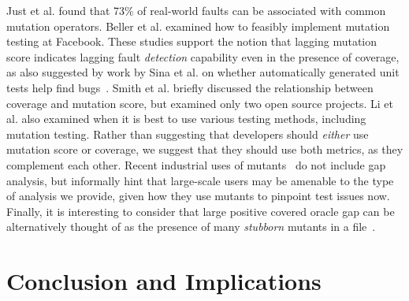 \documentclass[sigconf,review, anonymous]{acmart}
\begin{document}

\begin{comment}
Delgado-Pérez et al. \cite{DelgadoPerezCaseStudy} also performed mutation testing on 2,509 mutants over 15 functions. Their study 
primarily focused on analyzing equivalent mutants and the computational cost of finding these mutants.
They agree with the hypothesis that mutation testing is a better predictor of faults than a
traditional coverage based approach. This large scale study of mutation is similar to our Java study of a large number of
mutants, however the analysis and results differ in that they were analyzing equivalent mutants, while we are examining the
correlation between mutation score and coverage through the lens of the oracle gap. Additionally, our study is over a much 
larger sample size, with over 30 Java projects, that total have 463,417 lines of code, making it more appropriate for extrapolating
generalizable correlations.
\end{comment}

Just et al. \cite{JustMutationFault} found that 73\% of real-world faults can be associated with common mutation
operators. Beller et al. \cite{BellerFacebookMutation} examined how to feasibly
implement mutation testing at Facebook. These studies support the notion that
lagging mutation score indicates lagging fault \emph{detection}
capability even in the presence of coverage, as also suggested by work
by Sina et al. on whether automatically generated unit tests help find bugs~\cite{DoGenerated}.
Smith et al. \cite{SmithCoverageMutation} briefly discussed the
relationship between coverage and mutation score, but 
examined only two open source projects. Li et al. \cite{LiCoverageMutation} also examined when it is best to use various testing methods, including mutation testing. Rather than suggesting
that developers should \emph{either} use mutation score or coverage, we suggest that they should use both metrics, as they
complement each other.  Recent industrial uses of
mutants~\cite{PetrovicMutationGoogle,BellerFacebookMutation} do not
include gap analysis, but informally hint that large-scale users may
be amenable to the type of analysis we provide, given how they use
mutants to pinpoint test issues now.  Finally, it is interesting to consider that
large positive covered oracle gap can be alternatively thought of as
the presence of many \emph{stubborn} mutants in a file~\cite{papadakis2018mutant}.


\section{Conclusion and Implications}



\end{document}
